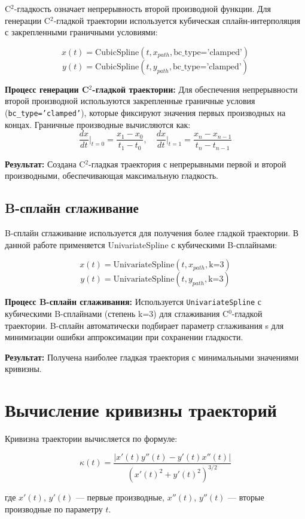 C$^2$-гладкость означает непрерывность второй производной функции. Для генерации C$^2$-гладкой траектории используется кубическая сплайн-интерполяция с закрепленными граничными условиями:

$$x(t) = \text{CubicSpline}(t, x_{path}, \text{bc\_type='clamped'})$$
$$y(t) = \text{CubicSpline}(t, y_{path}, \text{bc\_type='clamped'})$$

\textbf{Процесс генерации C$^2$-гладкой траектории:} Для обеспечения непрерывности второй производной используются закрепленные граничные условия (\texttt{bc\_type='clamped'}), которые фиксируют значения первых производных на концах. Граничные производные вычисляются как:
$$\frac{dx}{dt}\bigg|_{t=0} = \frac{x_1 - x_0}{t_1 - t_0}, \quad \frac{dx}{dt}\bigg|_{t=1} = \frac{x_n - x_{n-1}}{t_n - t_{n-1}}$$

\textbf{Результат:} Создана C$^2$-гладкая траектория с непрерывными первой и второй производными, обеспечивающая максимальную гладкость.

\subsection{B-сплайн сглаживание}

B-сплайн сглаживание используется для получения более гладкой траектории. В данной работе применяется UnivariateSpline с кубическими B-сплайнами:

$$x(t) = \text{UnivariateSpline}(t, x_{path}, \text{k=3})$$
$$y(t) = \text{UnivariateSpline}(t, y_{path}, \text{k=3})$$

\textbf{Процесс B-сплайн сглаживания:} Используется \texttt{UnivariateSpline} с кубическими B-сплайнами (степень k=3) для сглаживания C$^0$-гладкой траектории. B-сплайн автоматически подбирает параметр сглаживания s для минимизации ошибки аппроксимации при сохранении гладкости.

\textbf{Результат:} Получена наиболее гладкая траектория с минимальными значениями кривизны.

\section{Вычисление кривизны траекторий}

Кривизна траектории вычисляется по формуле:

$$\kappa(t) = \frac{|x'(t)y''(t) - y'(t)x''(t)|}{(x'(t)^2 + y'(t)^2)^{3/2}}$$

где $x'(t)$, $y'(t)$ --- первые производные, $x''(t)$, $y''(t)$ --- вторые производные по параметру $t$.

